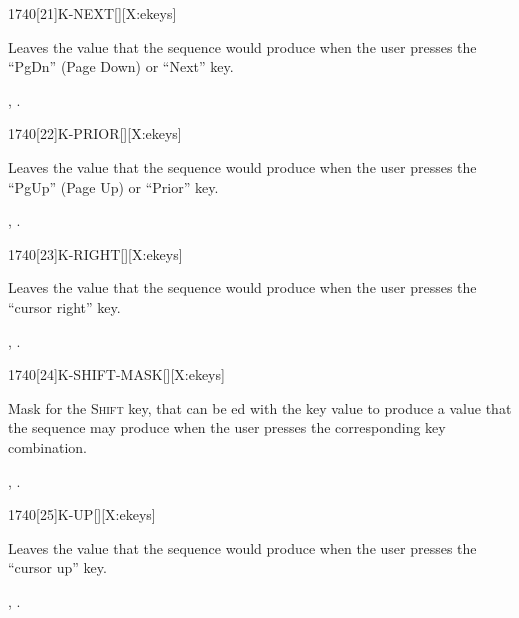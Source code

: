 \begin{worddef}{1740}[21]{K-NEXT}[][X:ekeys]
\item {}

	Leaves the value  that the sequence 
	 would produce when the user presses the
	``PgDn'' (Page Down) or ``Next'' key.

\see {},
	.
\end{worddef}


\begin{worddef}{1740}[22]{K-PRIOR}[][X:ekeys]
\item {}

	Leaves the value  that the sequence 
	 would produce when the user presses the
	``PgUp'' (Page Up) or ``Prior'' key.

\see {},
	.
\end{worddef}


\begin{worddef}{1740}[23]{K-RIGHT}[][X:ekeys]
\item {}

	Leaves the value  that the sequence 
	 would produce when the user presses the
	``cursor right'' key.

\see {},
	.
\end{worddef}


\begin{worddef}{1740}[24]{K-SHIFT-MASK}[][X:ekeys]
\item {}

	Mask for the \textsc{Shift} key, that can be ed with the
	key value to produce a value that the sequence 
	 may produce when the user presses the
	corresponding key combination.

\see {},
	.
\end{worddef}


\begin{worddef}{1740}[25]{K-UP}[][X:ekeys]
\item {}

	Leaves the value  that the sequence 
	 would produce when the user presses the
	``cursor up'' key.

\see {},
	.
\end{worddef}


